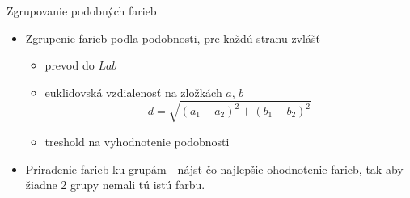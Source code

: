 \begin{frame}{Zgrupovanie podobných farieb}
\begin{itemize}

\begin{textblock*}{2.5cm}(9.5cm,3.5cm)
\end{textblock*}

\item<2->Zgrupenie farieb podla podobnosti, pre každú stranu zvlášť
    \begin{itemize}
    \item<3-> prevod do $Lab$
    \item<4-> euklidovská vzdialenosť na zložkách $a$, $b$
    $$ d = \sqrt{(a_1-a_2)^2+(b_1-b_2)^2}$$
    \item<5-> treshold na vyhodnotenie podobnosti
    \end{itemize}
\item<6-> Priradenie farieb ku grupám - nájsť čo najlepšie ohodnotenie farieb, tak aby žiadne 2 grupy nemali tú istú farbu.
\end{itemize}
\end{frame}
